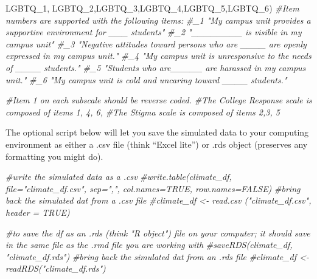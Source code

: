 \documentclass[
  english,
]{book}
\newenvironment{Shaded}{\begin{snugshade}}{\end{snugshade}}
\newcommand{\CommentTok}[1]{\textcolor[rgb]{0.56,0.35,0.01}{\textit{#1}}}
\newcommand{\NormalTok}[1]{#1}
\newcommand{\StringTok}[1]{\textcolor[rgb]{0.31,0.60,0.02}{#1}}
\begin{document}
\begin{Shaded}
\begin{Highlighting}[]
         \StringTok{\textquotesingle{}LGBTQ\_1\textquotesingle{}}\NormalTok{, }\StringTok{\textquotesingle{}LGBTQ\_2\textquotesingle{}}\NormalTok{,}\StringTok{\textquotesingle{}LGBTQ\_3\textquotesingle{}}\NormalTok{,}\StringTok{\textquotesingle{}LGBTQ\_4\textquotesingle{}}\NormalTok{,}\StringTok{\textquotesingle{}LGBTQ\_5\textquotesingle{}}\NormalTok{,}\StringTok{\textquotesingle{}LGBTQ\_6\textquotesingle{}}\NormalTok{)}
\CommentTok{\#Item numbers are supported with the following items:}
\CommentTok{\#\_1 "My campus unit provides a supportive environment for \_\_\_ students"}
\CommentTok{\#\_2 "\_\_\_\_\_\_\_\_ is visible in my campus unit"}
\CommentTok{\#\_3 "Negative attitudes toward persons who are \_\_\_\_ are openly expressed in my campus unit."}
\CommentTok{\#\_4 "My campus unit is unresponsive to the needs of \_\_\_\_ students."}
\CommentTok{\#\_5 "Students who are\_\_\_\_\_ are harassed in my campus unit."}
\CommentTok{\#\_6 "My campus unit is cold and uncaring toward \_\_\_\_ students."}

\CommentTok{\#Item 1 on each subscale should be reverse coded.}
\CommentTok{\#The College Response scale is composed of items 1, 4, 6, }
\CommentTok{\#The Stigma scale is composed of items 2,3, 5}
\end{Highlighting}
\end{Shaded}

The optional script below will let you save the simulated data to your computing environment as either a .csv file (think ``Excel lite'') or .rds object (preserves any formatting you might do).

\begin{Shaded}
\begin{Highlighting}[]
\CommentTok{\#write the simulated data  as a .csv}
\CommentTok{\#write.table(climate\_df, file="climate\_df.csv", sep=",", col.names=TRUE, row.names=FALSE)}
\CommentTok{\#bring back the simulated dat from a .csv file}
\CommentTok{\#climate\_df \textless{}{-} read.csv ("climate\_df.csv", header = TRUE)}
\end{Highlighting}
\end{Shaded}

\begin{Shaded}
\begin{Highlighting}[]
\CommentTok{\#to save the df as an .rds (think "R object") file on your computer; it should save in the same file as the .rmd file you are working with}
\CommentTok{\#saveRDS(climate\_df, "climate\_df.rds")}
\CommentTok{\#bring back the simulated dat from an .rds file}
\CommentTok{\#climate\_df \textless{}{-} readRDS("climate\_df.rds")}
\end{Highlighting}
\end{Shaded}
\end{document}
